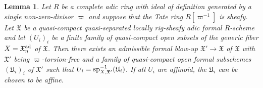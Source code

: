 \documentclass[12pt,twoside,a4paper]{article}
\newtheorem{lemma}[thm]{Lemma}
\theoremstyle{definition}
\theoremstyle{remark}
\newcommand\ad{{\rm ad}}
\newcommand\spc{{\rm sp}}
\begin{document}
\begin{lemma}\label{Open covers and formal models}Let $R$ be a complete adic ring with ideal of definition generated by a single non-zero-divisor $\varpi$ and suppose that the Tate ring $R[\varpi^{-1}]$ is sheafy. Let $\mathfrak{X}$ be a quasi-compact quasi-separated locally rig-sheafy adic formal $R$-scheme and let $(U_{i})_{i}$ be a finite family of quasi-compact open subsets of the generic fiber $X=\mathfrak{X}_{\eta}^{\ad}$ of $\mathfrak{X}$. Then there exists an admissible formal blow-up $\mathfrak{X}'\to \mathfrak{X}$ of $\mathfrak{X}$ with $\mathfrak{X}'$ being $\varpi$-torsion-free and a family of quasi-compact open formal subschemes $(\mathfrak{U}_{i})_{i}$ of $\mathfrak{X}'$ such that $U_{i}=\spc_{X,\mathfrak{X}'}^{-1}(\mathfrak{U}_{i})$. If all $U_{i}$ are affinoid, the $\mathfrak{U}_{i}$ can be chosen to be affine.\end{lemma}
\end{document}
